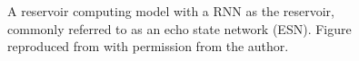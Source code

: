 \begin{figure}[t]
	\centering
    
    \vspace{0.35cm}
	\caption[A reservoir computing model with a RNN as the reservoir, commonly referred to as an echo state network (ESN).]
	        {A reservoir computing model with a RNN as the reservoir, commonly referred to as an echo state network (ESN).
    	 	 Figure reproduced from \citet{pieters_reservoir_2022} with permission from the author.}
	\label{fig:rc_diagram}
\end{figure}